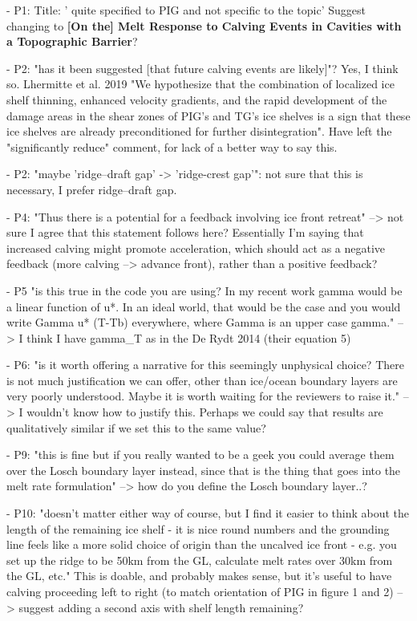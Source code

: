 - P1: Title: ' quite specified to PIG and not specific to the topic' 
	Suggest changing to \textbf{[On the] Melt Response to Calving Events in Cavities with a Topographic Barrier}? 
	
- P2: "has it been suggested [that future calving events are likely]"? 
    Yes, I think so. Lhermitte et al. 2019 "We hypothesize that the combination of localized ice shelf thinning, enhanced velocity gradients, and the rapid development of the damage areas in the shear zones of PIG’s and TG’s ice shelves is a sign that these ice shelves are already preconditioned for further disintegration". Have left the "significantly reduce" comment, for lack of a better way to say this.
    
- P2: "maybe 'ridge--draft gap' -> 'ridge-crest gap'": not sure that this is necessary, I prefer ridge--draft gap.

- P4: "Thus there is a potential for a feedback involving ice front retreat" --> not sure I agree that this statement follows here? Essentially I'm saying that increased calving might promote acceleration, which should act as a negative feedback (more calving --> advance front), rather than a positive feedback?

- P5 "is this true in the code you are using?  In my recent work gamma would be a linear function of u*.  In an ideal world, that would be the case and you would write Gamma u* (T-Tb) everywhere, where Gamma is an upper case gamma." --> I think I have gamma_T as in the De Rydt 2014 (their equation 5)

- P6: "is it worth offering a narrative for this seemingly unphysical choice?  There is not much justification we can offer, other than ice/ocean boundary layers are very poorly understood.  Maybe it is worth waiting for the reviewers to raise it." --> I wouldn't know how to justify this. Perhaps we could say that results are qualitatively similar if we set this to the same value?

- P9: "this is fine but if you really wanted to be a geek you could average them over the Losch boundary layer instead, since that is the thing that goes into the melt rate formulation" --> how do you define the Losch boundary layer..?

- P10: "doesn't matter either way of course, but I find it easier to think about the length of the remaining ice shelf - it is nice round numbers and the grounding line feels like a more solid choice of origin than the uncalved ice front - e.g. you set up the ridge to be 50km from the GL, calculate melt rates over 30km from the GL, etc." This is doable, and probably makes sense, but it's useful to have calving proceeding left to right (to match orientation of PIG in figure 1 and 2) --> suggest adding a second axis with shelf length remaining?

